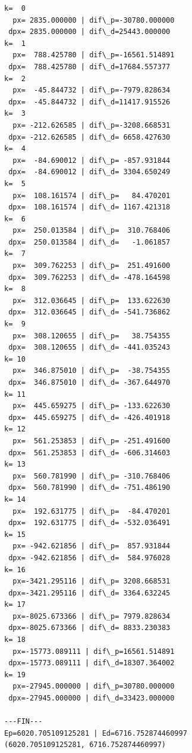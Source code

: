 \documentclass[11pt]{article}
\begin{document}
\begin{multicols}{2}\scriptsize
    \begin{Verbatim}[commandchars=\\\{\}]
k=  0
  px= 2835.000000 | dif\_p=-30780.000000
 dpx= 2835.000000 | dif\_d=25443.000000
k=  1
  px=  788.425780 | dif\_p=-16561.514891
 dpx=  788.425780 | dif\_d=17684.557377
k=  2
  px=  -45.844732 | dif\_p=-7979.828634
 dpx=  -45.844732 | dif\_d=11417.915526
k=  3
  px= -212.626585 | dif\_p=-3208.668531
 dpx= -212.626585 | dif\_d= 6658.427630
k=  4
  px=  -84.690012 | dif\_p= -857.931844
 dpx=  -84.690012 | dif\_d= 3304.650249
k=  5
  px=  108.161574 | dif\_p=   84.470201
 dpx=  108.161574 | dif\_d= 1167.421318
k=  6
  px=  250.013584 | dif\_p=  310.768406
 dpx=  250.013584 | dif\_d=   -1.061857
k=  7
  px=  309.762253 | dif\_p=  251.491600
 dpx=  309.762253 | dif\_d= -478.164598
k=  8
  px=  312.036645 | dif\_p=  133.622630
 dpx=  312.036645 | dif\_d= -541.736862
k=  9
  px=  308.120655 | dif\_p=   38.754355
 dpx=  308.120655 | dif\_d= -441.035243
k= 10
  px=  346.875010 | dif\_p=  -38.754355
 dpx=  346.875010 | dif\_d= -367.644970
k= 11
  px=  445.659275 | dif\_p= -133.622630
 dpx=  445.659275 | dif\_d= -426.401918
k= 12
  px=  561.253853 | dif\_p= -251.491600
 dpx=  561.253853 | dif\_d= -606.314603
k= 13
  px=  560.781990 | dif\_p= -310.768406
 dpx=  560.781990 | dif\_d= -751.486190
k= 14
  px=  192.631775 | dif\_p=  -84.470201
 dpx=  192.631775 | dif\_d= -532.036491
k= 15
  px= -942.621856 | dif\_p=  857.931844
 dpx= -942.621856 | dif\_d=  584.976028
k= 16
  px=-3421.295116 | dif\_p= 3208.668531
 dpx=-3421.295116 | dif\_d= 3364.632245
k= 17
  px=-8025.673366 | dif\_p= 7979.828634
 dpx=-8025.673366 | dif\_d= 8833.230383
k= 18
  px=-15773.089111 | dif\_p=16561.514891
 dpx=-15773.089111 | dif\_d=18307.364002
k= 19
  px=-27945.000000 | dif\_p=30780.000000
 dpx=-27945.000000 | dif\_d=33423.000000

---FIN---
Ep=6020.705109125281 | Ed=6716.752874460997
(6020.705109125281, 6716.752874460997)
    \end{Verbatim}
\end{multicols}
\end{document}
